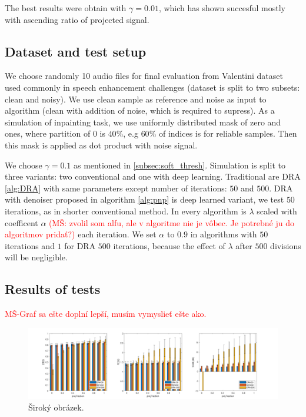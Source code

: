 \documentclass[conference]{IEEEtran}
\newcommand{\todo}[1]{\textcolor{red}{#1}}
\begin{document}
The best results were obtain with $\gamma=0.01$, which has shown succesful mostly with ascending ratio of projected signal.

\subsection{Dataset and test setup}
We choose randomly 10 audio files for final evaluation from Valentini dataset \cite{ValentiniBotinhao2017} used commonly in speech enhancement challenges (dataset is split to two subsets: clean and noisy).
We use clean sample as reference and noise as input to algorithm (clean with addition of noise, which is required to supress).
As a simulation of inpainting task, we use uniformly distributed mask of zero and ones, where partition of 0 is $40\%$,
e.g $60\%$ of indices is for reliable samples.
Then this mask is applied as dot product with noise signal.

We choose $\gamma = 0.1$ as mentioned in \ref{subsec:soft_thresh}.
Simulation is split to three variants: two conventional and one with deep learning.
Traditional are DRA \ref{alg:DRA} with same parameters except number of iterations: $50$ and $500$.
DRA with denoiser proposed in algorithm \ref{alg:pnp} is deep learned variant, we test $50$ iterations,
as in shorter conventional method.
In every algorithm is $\lambda$ scaled with coefficent $\alpha$ \todo{(MŠ: zvolil som alfu, ale v algoritme nie je vôbec. Je potrebné ju do algoritmov pridať?)} each iteration.
We set $\alpha$ to $0.9$ in algorithms with $50$ iterations and $1$ for DRA $500$ iterations, because the effect of $\lambda$ after $500$ divisions will be negligible.



\subsection{Results of tests}



\todo{MŠ-Graf sa ešte doplní lepší, musím vymyslieť ešte ako.}

\begin{figure}
	\includegraphics[width=\linewidth]{figures/final2_with_errors}
	\caption{Široký obrázek.}
	\label{fig:final2witherrors}
\end{figure}
\end{document}
